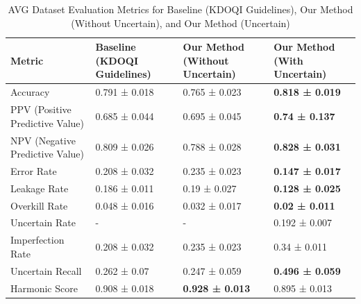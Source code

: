 \documentclass{ieeeaccess}
\begin{document}
\begin{table}[H]
\caption{AVG Dataset Evaluation Metrics for Baseline (KDOQI Guidelines), Our Method (Without Uncertain), and Our Method (Uncertain)}
\label{CombinedMetricsAVG}
\setlength{\tabcolsep}{3pt}
\renewcommand{\arraystretch}{1.5}
\begin{tabular}{|p{80pt}|p{45pt}|p{45pt}|p{45pt}|}
\hline
Metric & Baseline (KDOQI Guidelines) & Our Method (Without Uncertain) & Our Method (With Uncertain) \\ 
\hline
Accuracy & 0.791 ± 0.018 & 0.765 ± 0.023 & \textbf{0.818 ± 0.019} \\ 
\hline
PPV (Positive Predictive Value) & 0.685 ± 0.044 & 0.695 ± 0.045 & \textbf{0.74 ± 0.137} \\ 
\hline
NPV (Negative Predictive Value) & 0.809 ± 0.026 & 0.788 ± 0.028 & \textbf{0.828 ± 0.031} \\ 
\hline
Error Rate & 0.208 ± 0.032 & 0.235 ± 0.023 & \textbf{0.147 ± 0.017} \\ 
\hline
Leakage Rate & 0.186 ± 0.011 & 0.19 ± 0.027 & \textbf{0.128 ± 0.025} \\ 
\hline
Overkill Rate & 0.048 ± 0.016 & 0.032 ± 0.017 & \textbf{0.02 ± 0.011} \\ 
\hline
Uncertain Rate & - & - & 0.192 ± 0.007 \\ 
\hline
Imperfection Rate & 0.208 ± 0.032 & 0.235 ± 0.023 & 0.34 ± 0.011 \\ 
\hline
Uncertain Recall & 0.262 ± 0.07 & 0.247 ± 0.059 & \textbf{0.496 ± 0.059} \\ 
\hline
Harmonic Score & 0.908 ± 0.018 & \textbf{0.928 ± 0.013} & 0.895 ± 0.013 \\ 
\hline
\end{tabular}
\end{table}
\end{document}
